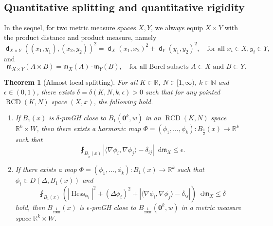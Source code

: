 \documentclass[11pt,reqno]{amsart}
\newtheorem{theorem}{Theorem}[section]
\theoremstyle{definition}
\numberwithin{equation}{section}
\newcommand{\di}{\mathop{}\!\mathrm{d}}
\newcommand{\meas}{\mathfrak{m}}
\DeclareMathOperator{\dist}{\mathsf{d}}
\DeclareMathOperator{\Hess}{Hess}
\DeclareMathOperator{\RCD}{RCD}
\begin{document}
\subsection{Quantitative splitting and quantitative rigidity}\label{subsec:almost splitting}
In the sequel, for two metric measure spaces $X, Y$, we always equip $X\times Y$ with the product distance and product measure, namely
\begin{equation}\label{product1}
    \dist_{X\times Y}((x_1, y_1), (x_2, y_2))^2=\dist_X(x_1, x_2)^2+\dist_Y(y_1, y_2)^2, \quad \text{for all $x_i \in X, y_i \in Y$,}
\end{equation}
and
\begin{equation}\label{product2}
    \meas_{X\times Y}(A\times B)=\meas_X(A)\cdot \meas_Y(B), \quad \text{for all Borel subsets $A \subset X$ and $B \subset Y$.}
\end{equation}
\begin{theorem}[Almost local splitting]\label{almost splitting}
For all $K \in \mathbb{R}$, $N \in [1, \infty)$, $k \in \mathbb{N}$ and $\epsilon \in (0,1)$, there exists $\delta=\delta(K, N, k, \epsilon)>0$ such that for any pointed $\RCD(K,N)$ space $(X, x)$, the following hold.
\begin{enumerate}
    \item  If $B_1(x)$ is $\delta$-pmGH close to $B_1(\mathbf{0}^k, w)$ in an $\RCD(K, N)$ space $\mathbb{R}^k\times W$, then there exists a harmonic map $\Phi=(\phi_1, \ldots, \phi_k) :B_{\frac{1}{2}}(x) \to \mathbb{R}^k$ such that 
    \begin{equation}
        \fint_{B_{\frac{1}{2}}(x)}\left|\langle \nabla \phi_i, \nabla \phi_j\rangle -\delta_{ij} \right|\di \meas_X \le \epsilon.
    \end{equation}
    \item If there exists a map $\Phi=(\phi_1, \ldots, \phi_k):B_1(x) \to \mathbb{R}^k$ such that $\phi_i \in D(\Delta, B_1(x))$ and
    \begin{equation}
        \fint_{B_1(x)}\left(|\Hess_{\phi_i}|^2 + (\Delta \phi_i)^2 +\left|\langle \nabla \phi_i, \nabla \phi_j\rangle -\delta_{ij}\right|\right)\di \meas_X \le \delta
    \end{equation}
    hold, then $B_{\frac{1}{100n}}(x)$ is $\epsilon$-pmGH close to $B_{\frac{1}{100n}}(\mathbf{0}^k, w)$ in a metric measure space $\mathbb{R}^k \times W$.
\end{enumerate}
\end{theorem}
\end{document}
